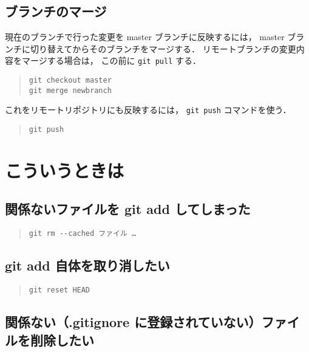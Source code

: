 \documentclass[a4j,10pt]{jarticle}
\begin{document}
\subsection{ブランチのマージ}
現在のブランチで行った変更を master ブランチに反映するには，
master ブランチに切り替えてからそのブランチをマージする．
リモートブランチの変更内容をマージする場合は，
この前に \verb|git pull| する．

\begin{quote}
\begin{verbatim}
git checkout master
git merge newbranch
\end{verbatim}
\end{quote}

これをリモートリポジトリにも反映するには，
\verb|git push| コマンドを使う．

\begin{quote}
\begin{verbatim}
git push
\end{verbatim}
\end{quote}

\section{こういうときは}

\subsection{関係ないファイルを git add してしまった}

\begin{quote}
\begin{verbatim}
git rm --cached ファイル …
\end{verbatim}
\end{quote}

\subsection{git add 自体を取り消したい}
\begin{quote}
\begin{verbatim}
git reset HEAD
\end{verbatim}
\end{quote}

\subsection{関係ない（.gitignore に登録されていない）ファイルを削除したい}
\end{document}
